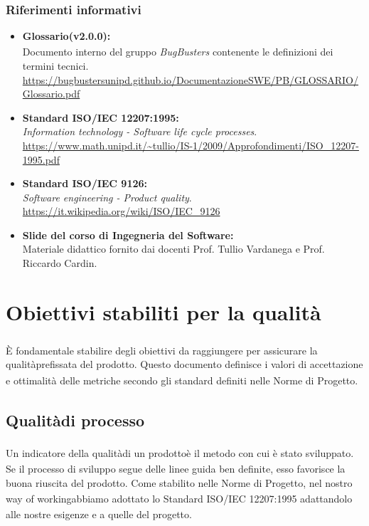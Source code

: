 \documentclass[a4paper,11pt]{article}
\renewcommand{\G}{\texorpdfstring{\textsubscript{\scalebox{0.6}{\textbf{G}}}\xspace}{ G}}
\begin{document}
\subsubsection{Riferimenti informativi}
\begin{itemize}
    \item \textbf{Glossario\G (v2.0.0):}\\
    Documento interno del gruppo \textit{BugBusters} contenente le definizioni dei termini tecnici.\\
    \url{https://bugbustersunipd.github.io/DocumentazioneSWE/PB/GLOSSARIO/Glossario.pdf}
    \item \textbf{Standard ISO/IEC 12207:1995:}\\
    \textit{Information technology - Software life cycle processes}.\\
    \url{https://www.math.unipd.it/~tullio/IS-1/2009/Approfondimenti/ISO_12207-1995.pdf}
    
    \item \textbf{Standard ISO/IEC 9126:}\\
    \textit{Software engineering - Product quality}.\\
    \url{https://it.wikipedia.org/wiki/ISO/IEC_9126}
    
    \item \textbf{Slide del corso di Ingegneria del Software:} \\
    Materiale didattico fornito dai docenti Prof. Tullio Vardanega e Prof. Riccardo Cardin.
\end{itemize}
\newpage

\section{Obiettivi stabiliti per la qualità\G}

È fondamentale stabilire degli obiettivi da raggiungere per assicurare la qualità\G prefissata del prodotto\G. 
Questo documento definisce i valori di accettazione e ottimalità delle metriche secondo gli standard definiti 
nelle Norme di Progetto\G.

\subsection{Qualità\G di processo}
Un indicatore della qualità\G di un prodotto\G è il metodo con cui è stato sviluppato. Se il processo di sviluppo segue 
delle linee guida ben definite, esso favorisce la buona riuscita del prodotto\G. Come stabilito nelle Norme di Progetto\G, 
nel nostro way of working\G abbiamo adottato lo Standard ISO/IEC 12207:1995 adattandolo alle nostre esigenze e a quelle 
del progetto\G. 
\end{document}
